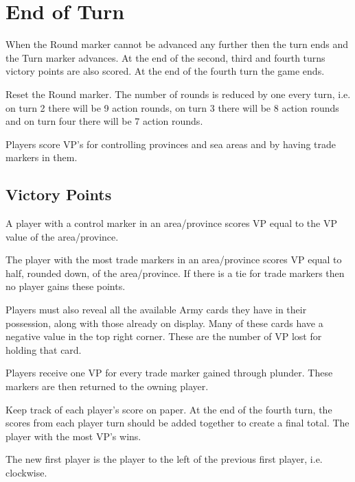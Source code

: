 \section{End of Turn}

When the Round marker cannot be advanced any further then the turn ends and the Turn marker advances. At the end of the second, third and fourth turns victory points are also scored. At the end of the fourth turn the game ends.

Reset the Round marker. The number of rounds is reduced by one every turn, i.e. on turn 2 there will be 9 action rounds, on turn 3 there will be 8 action rounds and on turn four there will be 7 action rounds.

Players score VP’s for controlling provinces and sea areas and by having trade markers in them.

\subsection{Victory Points}

A player with a control marker in an area/province scores VP equal to the VP value of the area/province.

The player with the most trade markers in an area/province scores VP equal to half, rounded down, of the area/province. If there is a tie for trade markers then no player gains these points.

Players must also reveal all the available Army cards they have in their possession, along with those already on display. Many of these cards have a negative value in the top right corner. These are the number of VP lost for holding that card.

Players receive one VP for every trade marker gained through plunder. These markers are then returned to the owning player.

Keep track of each player’s score on paper. At the end of the fourth turn, the scores from each player turn should be added together to create a final total. The player with the most VP’s wins.

The new first player is the player to the left of the previous first player, i.e. clockwise.